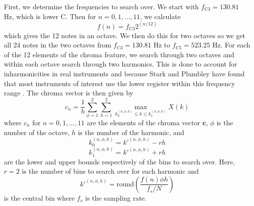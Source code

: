 \documentclass[journal]{IEEEtran}
\begin{document}
First, we determine the frequencies to search over.
We start with $f_{\text{C}3} = 130.81$ Hz, which is lower C.
Then for $n = 0, 1, \ldots, 11$, we calculate
\begin{equation}
    f(n) = f_{\text{C}3}2^{(n / 12)}
    \label{eq:freq}
\end{equation}
which gives the 12 notes in an octave.
We then do this for two octaves so we get all 24 notes in the two octaves from $f_{\text{C}3} = 130.81$ Hz to $f_{\text{C}5} = 523.25$ Hz.
For each of the 12 elements of the chroma feature, we search through two octaves and within each octave search through two harmonics.
This is done to account for inharmonicities in real instruments and because Stark and Plumbley have found that most instruments of interest use the lower register within this frequency range \cite{stark}.
The chroma vector is then given by
\begin{equation}
    c_n = \frac{1}{h}\sum_{\phi = 1}^2\sum_{h = 1}^2 \max_{k_0^{(n, \phi, h)} \leq k \leq k_1^{(n, \phi, h)}} X(k)
    \label{eq:chroma}
\end{equation}
where $c_n$ for $n = 0, 1, \ldots, 11$ are the elements of the chroma vector $\mathbf{c}$, $\phi$ is the number of the octave, $h$ is the number of the harmonic, and 
\begin{equation*}
    k_0^{(n, \phi, h)} = k'^{(n, \phi, h)} - rh
\end{equation*}
\begin{equation*}
    k_1^{(n, \phi, h)} = k'^{(n, \phi, h)} + rh
\end{equation*}
are the lower and upper bounds respectively of the bins to search over.
Here, $r = 2$ is the number of bins to search over for each harmonic and 
\begin{equation*}
    k'^{(n, \phi, h)} = \text{round}\!\left(\frac{f(n)\phi h}{f_s / N}\right)
\end{equation*}
is the central bin where $f_s$ is the sampling rate.
\end{document}
